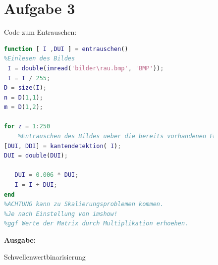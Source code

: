 \documentclass[12pt,a4paper,oneside]{article}
\begin{document}
\newpage

\begin{figure} 
\section*{Aufgabe 3}
Code zum Entrauschen:
\begin{lstlisting}[language=Matlab,frame=single]
function [ I ,DUI ] = entrauschen()
%Einlesen des Bildes
 I = double(imread('bilder\rau.bmp', 'BMP'));
 I = I / 255;
D = size(I);
n = D(1,1);
m = D(1,2);

for z = 1:250
    %Entrauschen des Bildes ueber die bereits vorhandenen Funktionen
[DUI, DDI] = kantendetektion( I);
DUI = double(DUI);
   
   DUI = 0.006 * DUI;
   I = I + DUI;
end
%ACHTUNG kann zu Skalierungsproblemen kommen.
%Je nach Einstellung von imshow!
%ggf Werte der Matrix durch Multiplikation erhoehen.


\end{lstlisting}

\textbf{Ausgabe:\\}
\caption{Schwellenwertbinarisierung} 
\end{figure} 
\end{document}
